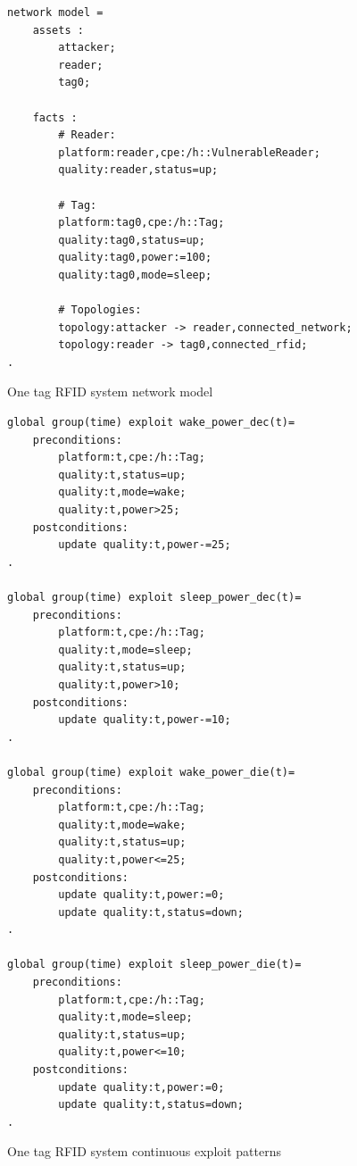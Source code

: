 \begin{figure}
\begin{lstlisting}
network model = 
    assets :
        attacker;
        reader;
        tag0;
    
    facts :
        # Reader:
        platform:reader,cpe:/h::VulnerableReader;
        quality:reader,status=up;
        
        # Tag:
        platform:tag0,cpe:/h::Tag;
        quality:tag0,status=up;
        quality:tag0,power:=100;
        quality:tag0,mode=sleep;
        
        # Topologies:
        topology:attacker -> reader,connected_network;
        topology:reader -> tag0,connected_rfid;
.
\end{lstlisting}
\caption{One tag RFID system network model}
\label{fig:rfid1_nm}
\end{figure}

\begin{figure}
\begin{lstlisting}
global group(time) exploit wake_power_dec(t)=
    preconditions:
        platform:t,cpe:/h::Tag;
        quality:t,status=up;
        quality:t,mode=wake;
        quality:t,power>25;
    postconditions:
        update quality:t,power-=25;
.

global group(time) exploit sleep_power_dec(t)=
    preconditions:
        platform:t,cpe:/h::Tag;
        quality:t,mode=sleep;
        quality:t,status=up;
        quality:t,power>10;
    postconditions:
        update quality:t,power-=10;
.

global group(time) exploit wake_power_die(t)=
    preconditions:
        platform:t,cpe:/h::Tag;
        quality:t,mode=wake;
        quality:t,status=up;
        quality:t,power<=25;
    postconditions:
        update quality:t,power:=0;
        update quality:t,status=down;
.

global group(time) exploit sleep_power_die(t)=
    preconditions:
        platform:t,cpe:/h::Tag;
        quality:t,mode=sleep;
        quality:t,status=up;
        quality:t,power<=10;
    postconditions:
        update quality:t,power:=0;
        update quality:t,status=down;
.
\end{lstlisting}
\caption{One tag RFID system continuous exploit patterns}
\label{fig:rfid1_real_xp}
\end{figure}

